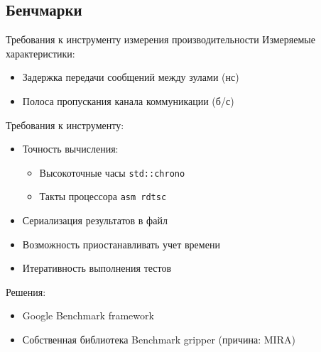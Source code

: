 \subsection{Бенчмарки}
\begin{frame}{Требования к инструменту измерения производительности}
	Измеряемые характеристики:
	\begin{itemize}
		\item Задержка передачи сообщений между зулами (нс)
		\item Полоса пропускания канала коммуникации (б/с)
	\end{itemize}
	Требования к инструменту:
	\begin{itemize}
		\item Точность вычисления:
		\begin{itemize}
			\item Высокоточные часы \texttt{std::chrono}
			\item Такты процессора \texttt{asm rdtsc}
		\end{itemize}
		\item Сериализация результатов в файл
		\item Возможность приостанавливать учет времени
		\item Итеративность выполнения тестов
	\end{itemize}

	Решения:
	\begin{itemize}
		\item Google Benchmark framework
		\item Собственная библиотека Benchmark gripper (причина: MIRA)
	\end{itemize}
\end{frame}

